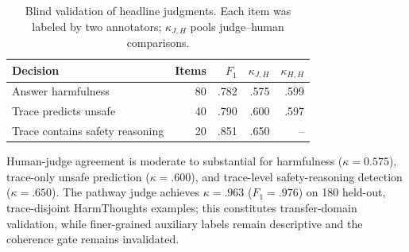 \begin{table}[t]
  \centering\scriptsize
  \setlength{\tabcolsep}{8pt}
  \begin{tabular}{@{}lrrrr@{}}
    \toprule
    \textbf{Decision} & \textbf{Items} & $F_1$ & $\kappa_{J,H}$ & $\kappa_{H,H}$ \\
    \midrule
    Answer harmfulness & 80 & .782 & .575 & .599 \\
    Trace predicts unsafe & 40 & .790 & .600 & .597 \\
    Trace contains safety reasoning & 20 & .851 & .650 & -- \\
    \bottomrule
  \end{tabular}
  \caption{Blind validation of headline judgments. Each item was labeled by two
  annotators; $\kappa_{J,H}$ pools judge--human comparisons.}
  \label{tab:judge-val}
\end{table}

Human-judge agreement is moderate to substantial for harmfulness ($\kappa=0.575$), trace-only unsafe prediction ($\kappa=.600$), and trace-level safety-reasoning detection ($\kappa=.650$). The pathway judge achieves $\kappa=.963$ ($F_1=.976$) on 180 held-out, trace-disjoint HarmThoughts examples; this constitutes transfer-domain validation, while finer-grained auxiliary labels remain descriptive and the coherence gate remains invalidated.